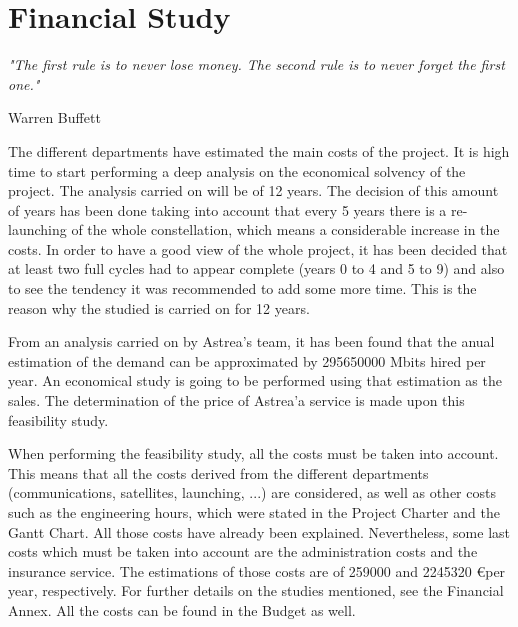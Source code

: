 \chapter{Financial Study}
\epigraph{\textit{"The first rule is to never lose money. The second rule is to never forget the first one."}}{Warren Buffett} 

The different departments have estimated the main costs of the project. It is high time to start performing a deep analysis on the economical solvency of the project. The analysis carried on will be of 12 years. The decision of this amount of years has been done taking into account that every 5 years there is a re-launching of the whole constellation, which means a considerable increase in the costs. In order to have a good view of the whole project, it has been decided that at least two full cycles had to appear complete (years 0 to 4 and 5 to 9) and also to see the tendency it was recommended to add some more time. This is the reason why the studied is carried on for 12 years.

From an analysis carried on by Astrea's team, it has been found that the anual estimation of the demand can be approximated by 295650000 Mbits hired per year. An economical study is going to be performed using that estimation as the sales. The determination of the price of Astrea'a service is made upon this feasibility study. 

When performing the feasibility study, all the costs must be taken into account. This means that all the costs derived from the different departments (communications, satellites, launching, ...) are considered, as well as other costs such as the engineering hours, which were stated in the Project Charter and the Gantt Chart. All those costs have already been explained. Nevertheless, some last costs which must be taken into account are the administration costs and the insurance service. The estimations of those costs are of 259000 and 2245320 \euro  per year, respectively. For further details on the studies mentioned, see the Financial Annex.  All the costs can be found in the Budget as well.




